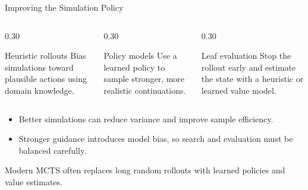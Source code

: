 \documentclass[aspectratio=169,10pt]{beamer}
\begin{document}
\begin{frame}[shrink=18]{Improving the Simulation Policy}
  \begin{columns}[T,onlytextwidth]
    \begin{column}{0.30\textwidth}
      \begin{block}{Heuristic rollouts}
        Bias simulations toward plausible actions using domain knowledge.
      \end{block}
    \end{column}
    \begin{column}{0.30\textwidth}
      \begin{block}{Policy models}
        Use a learned policy to sample stronger, more realistic continuations.
      \end{block}
    \end{column}
    \begin{column}{0.30\textwidth}
      \begin{block}{Leaf evaluation}
        Stop the rollout early and estimate the state with a heuristic or learned value model.
      \end{block}
    \end{column}
  \end{columns}
  \vspace{0.15in}
  \begin{itemize}
    \item Better simulations can reduce variance and improve sample efficiency.
    \item Stronger guidance introduces model bias, so search and evaluation must be balanced carefully.
  \end{itemize}
  \begin{keyidea}
    Modern MCTS often replaces long random rollouts with learned policies and value estimates.
  \end{keyidea}
\end{frame}
\end{document}
